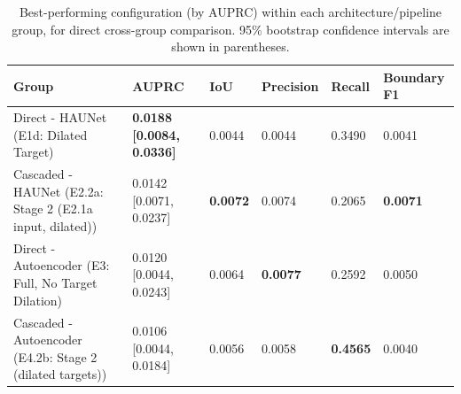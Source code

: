 \begin{table}[htbp]
\centering
\footnotesize
\caption{Best-performing configuration (by AUPRC) within each architecture/pipeline group, for direct cross-group comparison. 95\% bootstrap confidence intervals are shown in parentheses.}
\label{tab:best_overall}
\begin{tabularx}{\textwidth}{p{3.2cm}YYYYY}
\hline
\textbf{Group} & \textbf{AUPRC} & \textbf{IoU} & \textbf{Precision} & \textbf{Recall} & \textbf{Boundary F1} \\ \hline
Direct - HAUNet (E1d: Dilated Target) & \textbf{0.0188 [0.0084, 0.0336]} & 0.0044 & 0.0044 & 0.3490 & 0.0041 \\
Cascaded - HAUNet (E2.2a: Stage 2 (E2.1a input, dilated)) & 0.0142 [0.0071, 0.0237] & \textbf{0.0072} & 0.0074 & 0.2065 & \textbf{0.0071} \\
Direct - Autoencoder (E3: Full, No Target Dilation) & 0.0120 [0.0044, 0.0243] & 0.0064 & \textbf{0.0077} & 0.2592 & 0.0050 \\
Cascaded - Autoencoder (E4.2b: Stage 2 (dilated targets)) & 0.0106 [0.0044, 0.0184] & 0.0056 & 0.0058 & \textbf{0.4565} & 0.0040 \\
\hline
\end{tabularx}
\end{table}